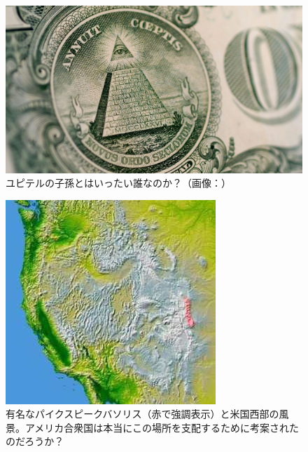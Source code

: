 \documentclass[10pt,twocolumn,letterpaper]{article}
\begin{document}
\begin{figure}[t]
\begin{center}
   \includegraphics[width=1\linewidth]{illuminati.jpg}
\end{center}
   \caption{ユピテルの子孫とはいったい誰なのか？（画像：\cite{35}）}
\label{fig:10}
\label{fig:onecol}
\end{figure}

\begin{figure}[t]
\begin{center}
   \includegraphics[width=1\linewidth]{pike.jpg}
\end{center}
   \caption{有名なパイクスピークバソリス（赤で強調表示）と米国西部の風景\cite{36}。アメリカ合衆国は本当にこの場所を支配するために考案されたのだろうか？}
\label{fig:11}
\label{fig:onecol}
\end{figure}
\end{document}
